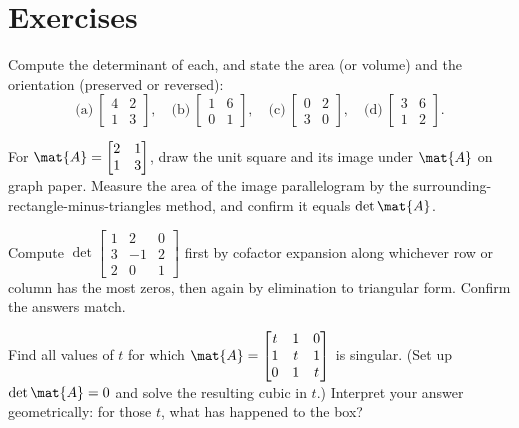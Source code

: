 \section{Exercises}
\label{ch21:exercises}

\begin{exercise}
\label{ch21:ex-warmup}
Compute the determinant of each, and state the area (or volume) and the
orientation (preserved or reversed):
\[
  \text{(a)}\ \begin{bmatrix} 4 & 2 \\ 1 & 3 \end{bmatrix},\quad
  \text{(b)}\ \begin{bmatrix} 1 & 6 \\ 0 & 1 \end{bmatrix},\quad
  \text{(c)}\ \begin{bmatrix} 0 & 2 \\ 3 & 0 \end{bmatrix},\quad
  \text{(d)}\ \begin{bmatrix} 3 & 6 \\ 1 & 2 \end{bmatrix}.
\]
\end{exercise}

\begin{exercise}
\label{ch21:ex-draw}
For $\mat{A} = \begin{bmatrix} 2 & 1 \\ 1 & 3 \end{bmatrix}$, draw the unit square
and its image under $\mat{A}$ on graph paper. Measure the area of the image
parallelogram by the surrounding-rectangle-minus-triangles method, and confirm it
equals $\det\mat{A}$.
\end{exercise}

\begin{exercise}
\label{ch21:ex-3x3-two-ways}
Compute $\det\begin{bmatrix} 1 & 2 & 0 \\ 3 & -1 & 2 \\ 2 & 0 & 1 \end{bmatrix}$
first by cofactor expansion along whichever row or column has the most zeros, then
again by elimination to triangular form. Confirm the answers match.
\end{exercise}

\begin{exercise}
\label{ch21:ex-singular}
Find all values of $t$ for which
$\mat{A} = \begin{bmatrix} t & 1 & 0 \\ 1 & t & 1 \\ 0 & 1 & t \end{bmatrix}$
is singular. (Set up $\det\mat{A} = 0$ and solve the resulting cubic in $t$.)
Interpret your answer geometrically: for those $t$, what has happened to the box?
\end{exercise}

